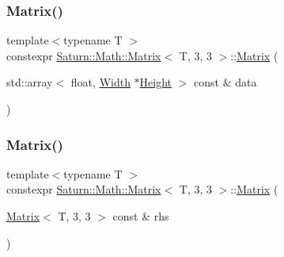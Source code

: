 \subsubsection{\texorpdfstring{Matrix()}{Matrix()}\hspace{0.1cm}{\footnotesize\ttfamily [2/4]}}
{\footnotesize\ttfamily template$<$typename T $>$ \\
constexpr \mbox{\hyperlink{class_saturn_1_1_math_1_1_matrix}{Saturn\+::\+Math\+::\+Matrix}}$<$ T, 3, 3 $>$\+::\mbox{\hyperlink{class_saturn_1_1_math_1_1_matrix}{Matrix}} (\begin{DoxyParamCaption}\item[{std\+::array$<$ float, \mbox{\hyperlink{class_saturn_1_1_math_1_1_matrix_3_01_t_00_013_00_013_01_4_a7df732e9641685e8dbbff6f06c6eedab}{Width}} $\ast$\mbox{\hyperlink{class_saturn_1_1_math_1_1_matrix_3_01_t_00_013_00_013_01_4_a6aaca5d7ab1d60b436c7f8076d2c8b06}{Height}} $>$ const \&}]{data }\end{DoxyParamCaption})\hspace{0.3cm}{\ttfamily [inline]}}

\mbox{\label{class_saturn_1_1_math_1_1_matrix_3_01_t_00_013_00_013_01_4_aa2dcca39a1ef77fc5c0b00f7cb87db92}} 
\subsubsection{\texorpdfstring{Matrix()}{Matrix()}\hspace{0.1cm}{\footnotesize\ttfamily [3/4]}}
{\footnotesize\ttfamily template$<$typename T $>$ \\
constexpr \mbox{\hyperlink{class_saturn_1_1_math_1_1_matrix}{Saturn\+::\+Math\+::\+Matrix}}$<$ T, 3, 3 $>$\+::\mbox{\hyperlink{class_saturn_1_1_math_1_1_matrix}{Matrix}} (\begin{DoxyParamCaption}\item[{\mbox{\hyperlink{class_saturn_1_1_math_1_1_matrix}{Matrix}}$<$ T, 3, 3 $>$ const \&}]{rhs }\end{DoxyParamCaption})\hspace{0.3cm}{\ttfamily [inline]}}

\mbox{\label{class_saturn_1_1_math_1_1_matrix_3_01_t_00_013_00_013_01_4_a6380e74478014212ef8c0cb9a3933b45}} 
